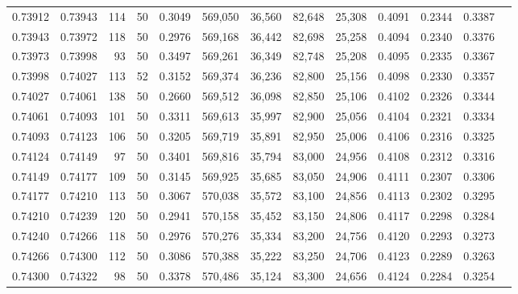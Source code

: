 \begin{tabular}{rrrrrrrrrrrrr}
0.73912 & 0.73943 &   114 &  50 &                                     0.3049 & 569,050 &  36,560 &  82,648 &  25,308 & 0.4091 & 0.2344 & 0.3387 \\
0.73943 & 0.73972 &   118 &  50 &                                     0.2976 & 569,168 &  36,442 &  82,698 &  25,258 & 0.4094 & 0.2340 & 0.3376 \\
0.73973 & 0.73998 &    93 &  50 &                                     0.3497 & 569,261 &  36,349 &  82,748 &  25,208 & 0.4095 & 0.2335 & 0.3367 \\
0.73998 & 0.74027 &   113 &  52 &                                     0.3152 & 569,374 &  36,236 &  82,800 &  25,156 & 0.4098 & 0.2330 & 0.3357 \\
0.74027 & 0.74061 &   138 &  50 &                                     0.2660 & 569,512 &  36,098 &  82,850 &  25,106 & 0.4102 & 0.2326 & 0.3344 \\
0.74061 & 0.74093 &   101 &  50 &                                     0.3311 & 569,613 &  35,997 &  82,900 &  25,056 & 0.4104 & 0.2321 & 0.3334 \\
0.74093 & 0.74123 &   106 &  50 &                                     0.3205 & 569,719 &  35,891 &  82,950 &  25,006 & 0.4106 & 0.2316 & 0.3325 \\
0.74124 & 0.74149 &    97 &  50 &                                     0.3401 & 569,816 &  35,794 &  83,000 &  24,956 & 0.4108 & 0.2312 & 0.3316 \\
0.74149 & 0.74177 &   109 &  50 &                                     0.3145 & 569,925 &  35,685 &  83,050 &  24,906 & 0.4111 & 0.2307 & 0.3306 \\
0.74177 & 0.74210 &   113 &  50 &                                     0.3067 & 570,038 &  35,572 &  83,100 &  24,856 & 0.4113 & 0.2302 & 0.3295 \\
0.74210 & 0.74239 &   120 &  50 &                                     0.2941 & 570,158 &  35,452 &  83,150 &  24,806 & 0.4117 & 0.2298 & 0.3284 \\
0.74240 & 0.74266 &   118 &  50 &                                     0.2976 & 570,276 &  35,334 &  83,200 &  24,756 & 0.4120 & 0.2293 & 0.3273 \\
0.74266 & 0.74300 &   112 &  50 &                                     0.3086 & 570,388 &  35,222 &  83,250 &  24,706 & 0.4123 & 0.2289 & 0.3263 \\
0.74300 & 0.74322 &    98 &  50 &                                     0.3378 & 570,486 &  35,124 &  83,300 &  24,656 & 0.4124 & 0.2284 & 0.3254 \\

\end{tabular}
